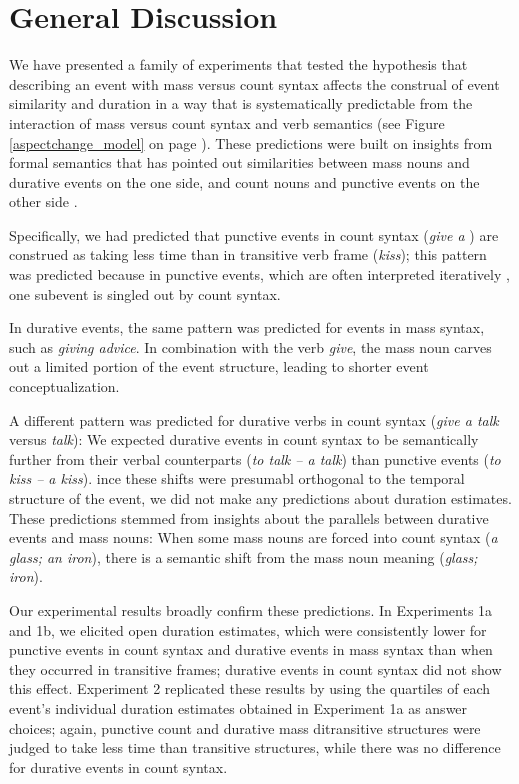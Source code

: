 \documentclass[review,12pt,authoryear]{elsarticle}
\newcommand*{\sectionformat}{\centering}
\begin{document}
\section*{\sectionformat General Discussion}
We have presented a family of experiments that tested the hypothesis that describing an event with mass versus count syntax affects the construal of event similarity and duration in a way that is systematically predictable from the interaction of mass versus count syntax and verb semantics (see Figure \ref{aspectchange_model} on page \pageref{aspectchange_model}). These predictions were built on insights from formal semantics that has pointed out similarities between mass nouns and durative events on the one side, and count nouns and punctive events on the other side \citep{Krifka1992,jackendoff1991parts,Harley05howdo,WellwoodOUP,bach1986algebra,casati2008event}.

Specifically, we had predicted that punctive events in count syntax (\emph{give a }) are construed as taking less time than in transitive verb frame (\emph{kiss}); this pattern was predicted because in punctive events, which are often interpreted iteratively \citep{Kim2015}, one subevent is singled out by count syntax.

In durative events, the same pattern was predicted for events in mass syntax, such as \emph{giving advice}. In combination with the  verb \emph{give}, the mass noun carves out a limited portion of the event structure, leading to shorter event conceptualization. 

A different pattern was predicted for durative verbs in count syntax (\emph{give a talk} versus \emph{talk}): We expected durative events in count syntax to be semantically further from their verbal counterparts (\emph{to talk -- a talk}) than punctive events (\emph{to kiss -- a kiss}). ince these shifts were presumabl orthogonal to the temporal structure of the event, we did not make any predictions about duration estimates. These predictions stemmed from insights about the parallels between durative events and mass nouns: When some mass nouns are forced into count syntax (\emph{a glass; an iron}), there is a semantic shift from the mass noun meaning (\emph{glass; iron}).

Our experimental results broadly confirm these predictions. In Experiments 1a and 1b, we elicited open duration estimates, which were consistently lower for punctive events in count syntax and durative events in mass syntax than when they occurred in transitive frames; durative events in count syntax did not show this effect. Experiment 2 replicated these results by using the quartiles of each event's individual duration estimates obtained in Experiment 1a as answer choices; again, punctive count and durative mass ditransitive structures were judged to take less time than transitive structures, while there was no difference for durative events in count syntax. 
\end{document}
